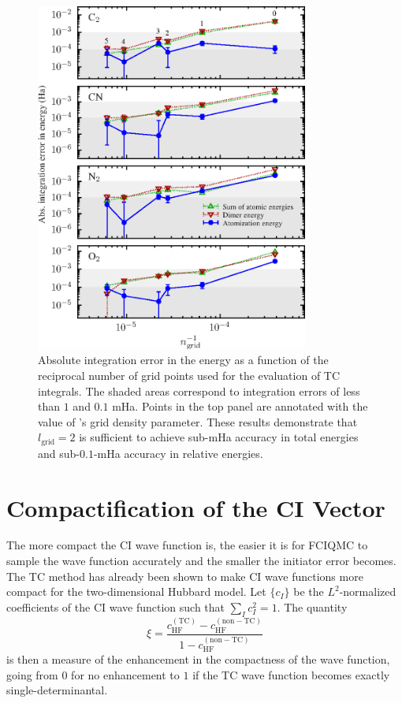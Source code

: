 \begin{figure}[htbp]
    \centering
    \includegraphics[width=0.8\textwidth]{figures/optimisation/Fig/griderr-dimers}
    \caption{Absolute integration error in the energy as a function of the reciprocal number of grid points used for the evaluation of TC integrals. The shaded areas correspond to integration errors of less than $1$ and $0.1$ mHa. Points in the top panel are annotated with the value of \pyscf's grid density parameter. These results demonstrate that $l_\mathrm{grid}=2$ is sufficient to achieve sub-mHa accuracy in total energies and sub-$0.1$-mHa accuracy in relative energies.}
    \label{fig:griderr-dimers}
\end{figure}


\section{Compactification of the CI Vector}
The more compact the CI wave function is, the easier it is for FCIQMC to sample the wave function accurately and the smaller the initiator error becomes. The TC method has already been shown to make CI wave functions more compact for the two-dimensional Hubbard model.\supercite{dobrautzCompact2019} Let $\{c_I\}$ be the $L^2$-normalized coefficients of the CI wave
function such that $\sum_I c_I^2=1$.
%
The quantity
%
\begin{equation}
  \label{eq:xi_compactness}
  \xi = \frac { c^\mathrm{(TC)}_\mathrm{HF} - c^\mathrm{(non-TC)}_\mathrm{HF} }{ 1 - c^\mathrm{(non-TC)}_\mathrm{HF} }
\end{equation}
%
is then a measure of the enhancement in the compactness of the wave
function, going from $0$ for no enhancement to $1$ if the TC wave
function becomes exactly single-determinantal.

